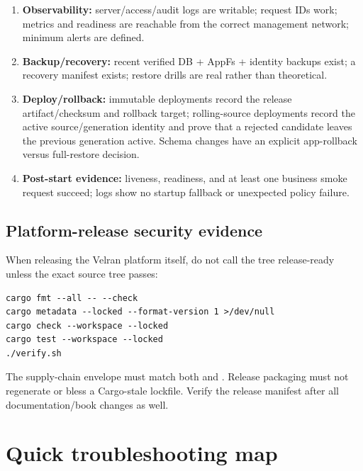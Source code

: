 \begin{enumerate}
  \item \textbf{Observability:} server/access/audit logs are writable; request IDs work; metrics and readiness are reachable from the correct management network; minimum alerts are defined.
  \item \textbf{Backup/recovery:} recent verified DB + AppFs + identity backups exist; a recovery manifest exists; restore drills are real rather than theoretical.
  \item \textbf{Deploy/rollback:} immutable deployments record the release artifact/checksum and rollback target; rolling-source deployments record the active source/generation identity and prove that a rejected candidate leaves the previous generation active. Schema changes have an explicit app-rollback versus full-restore decision.
  \item \textbf{Post-start evidence:} liveness, readiness, and at least one business smoke request succeed; logs show no startup fallback or unexpected policy failure.
\end{enumerate}

\subsection*{Platform-release security evidence}

When releasing the Velran platform itself, do not call the tree release-ready unless the exact source tree passes:

\begin{lstlisting}
cargo fmt --all -- --check
cargo metadata --locked --format-version 1 >/dev/null
cargo check --workspace --locked
cargo test --workspace --locked
./verify.sh
\end{lstlisting}

The supply-chain envelope must match both  and . Release packaging must not regenerate or bless a Cargo-stale lockfile. Verify the release manifest after all documentation/book changes as well.

\section{Quick troubleshooting map}

